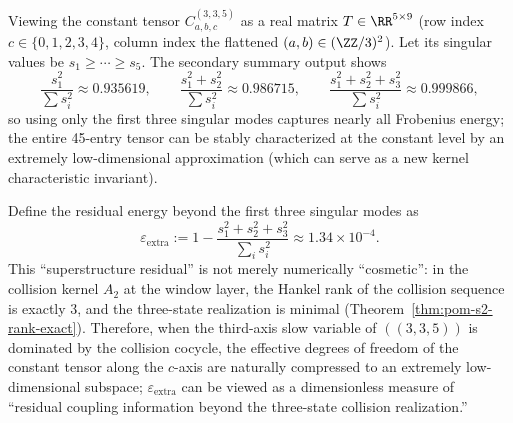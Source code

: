 \begin{remark}\label{prop:arity-335-low-rank}
Viewing the constant tensor $C^{(3,3,5)}_{a,b,c}$ as a real matrix $T\in\RR^{5\times 9}$ (row index $c\in\{0,1,2,3,4\}$, column index the flattened $(a,b)\in(\ZZ/3)^2$). Let its singular values be $s_1\ge \cdots\ge s_5$. The secondary summary output shows
\[
\frac{s_1^2}{\sum s_i^2}\approx 0.935619,\qquad
\frac{s_1^2+s_2^2}{\sum s_i^2}\approx 0.986715,\qquad
\frac{s_1^2+s_2^2+s_3^2}{\sum s_i^2}\approx 0.999866,
\]
so using only the first three singular modes captures nearly all Frobenius energy; the entire 45-entry tensor can be stably characterized at the constant level by an extremely low-dimensional approximation (which can serve as a new kernel characteristic invariant).
\end{remark}

\begin{remark}\label{rem:arity-335-low-rank-vs-hankel}
Define the residual energy beyond the first three singular modes as
\[
\varepsilon_{\mathrm{extra}}
:=1-\frac{s_1^2+s_2^2+s_3^2}{\sum_i s_i^2}\approx 1.34\times 10^{-4}.
\]
This ``superstructure residual'' is not merely numerically ``cosmetic'': in the collision kernel \(A_2\) at the window layer, the Hankel rank of the collision sequence is exactly \(3\), and the three-state realization is minimal (Theorem~\ref{thm:pom-s2-rank-exact}).
Therefore, when the third-axis slow variable of \(((3,3,5))\) is dominated by the collision cocycle, the effective degrees of freedom of the constant tensor along the \(c\)-axis are naturally compressed to an extremely low-dimensional subspace; \(\varepsilon_{\mathrm{extra}}\) can be viewed as a dimensionless measure of ``residual coupling information beyond the three-state collision realization.''
\end{remark}

